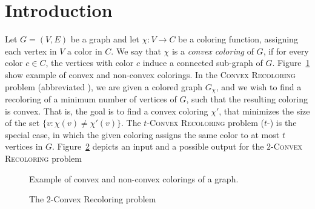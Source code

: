 
\section{Introduction}

Let $G = (V, E)$ be a graph and let $\chi : V \rightarrow C$ be a
coloring function, assigning each vertex in $V$ a color in $C$.  We
say that $\chi$ is a \emph{convex coloring} of $G$, if for every color
$c \in C$, the vertices with color $c$ induce a connected sub-graph of
$G$. Figure~\ref{fig:convex} show example of convex and non-convex colorings.
%
In the \textsc{Convex Recoloring} problem (abbreviated \CRP{}), 
we are given a colored graph $G_\chi$,
and we wish to find a recoloring of a minimum number of vertices of $G$,
such that the resulting coloring is convex. 
That is,
the goal is to find a convex coloring $\chi'$,
that minimizes the size of the set $\{v : \chi(v) \neq \chi'(v)\}$.
%
The \textsc{$t$-Convex Recoloring} problem ($t$-\CRP{}) is the special
case, in which the given coloring assigns the same color to at most
$t$ vertices in $G$.
Figure~\ref{fig:input-output} depicts an input and a possible output for the 
\textsc{$2$-Convex Recoloring} problem

\begin{figure}
\centering

\caption{
\label{fig:convex}
Example of convex and non-convex colorings of a graph.}
\end{figure}

\begin{figure}
\centering

\caption{
\label{fig:input-output}
The $2$-Convex Recoloring problem
}
\end{figure}


